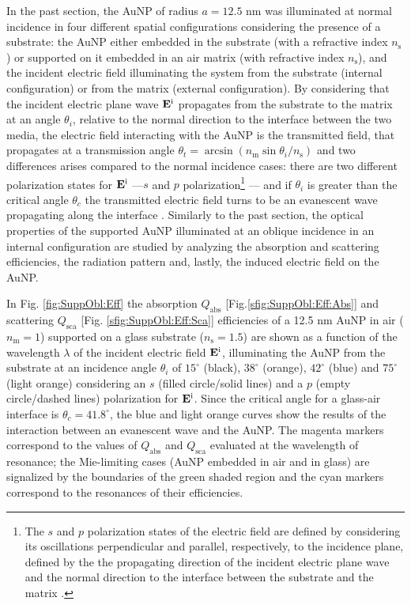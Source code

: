 
In the past section, the AuNP of radius $a = 12.5$ nm was illuminated at normal incidence in four different spatial configurations considering the  presence of a substrate: the AuNP either embedded in the substrate (with a refractive index $n_\text{s}$) or supported on it embedded in an air matrix (with refractive index $n_\text{s}$), and the incident electric field  illuminating the system from the substrate (internal configuration) or from the matrix (external configuration). By considering that the incident electric plane wave $\vb{E}^\text{i}$  propagates from the substrate to the matrix at an angle $\theta_i$, relative to the normal direction to the interface between the two media, the electric field interacting with the AuNP is the transmitted field, that propagates at a transmission angle $\theta_t = \arcsin(n_\text{m}\sin\theta_i/n_\text{s})$ \cite{born_max_principle_1999} and two differences arises compared to the normal incidence cases: there are two different polarization states for $\vb{E}^\text{i}$ ---$s$ and $p$ polarization\footnote{%
    The $s$ and $p$ polarization states of the electric field are defined by considering its oscillations perpendicular and parallel, respectively, to the incidence plane, defined by the the propagating direction of the incident electric plane wave and the normal direction to the interface between the substrate and the matrix \cite{bohren_absorption_1983}.}%
--- and if $\theta_i$ is greater than the critical angle $\theta_c$ the transmitted electric field turns to be an evanescent wave propagating along the interface  \cite{born_max_principle_1999}. Similarly to the past section, the optical properties of the supported AuNP illuminated at an oblique incidence in an internal configuration are studied by analyzing the absorption and scattering efficiencies, the radiation pattern and, lastly, the induced electric field on the AuNP.

In Fig. \ref{fig:SuppObl:Eff} the absorption $Q_\text{abs}$ [Fig.\ref{sfig:SuppObl:Eff:Abs}] and scattering $Q_\text{sca}$ [Fig. \ref{sfig:SuppObl:Eff:Sca}] efficiencies of a 12.5 nm AuNP in air ($n_\text{m} = 1$) supported on a glass substrate ($n_\text{s} = 1.5$) are shown as a function of the wavelength $\lambda$ of the incident electric field $\vb{E}^\text{i}$, illuminating the AuNP from the substrate at an incidence angle $\theta_i$ of $15^\circ$ (black),  $38^\circ$ (orange),   $42^\circ$ (blue) and  $75^\circ$ (light orange) considering an $s$ (filled circle/solid lines) and a $p$ (empty circle/dashed lines) polarization for $\vb{E}^\text{i}$. Since the critical angle for a glass-air interface is $\theta_c = 41.8^\circ$, the blue and light orange curves show the results of the interaction between an evanescent wave and the AuNP. The magenta markers correspond to the values of $Q_\text{abs}$ and $Q_\text{sca}$ evaluated at the wavelength of resonance; the Mie-limiting cases (AuNP embedded in air and in glass)  are signalized by the boundaries of the green shaded region  and the cyan markers correspond to the resonances of their efficiencies.

